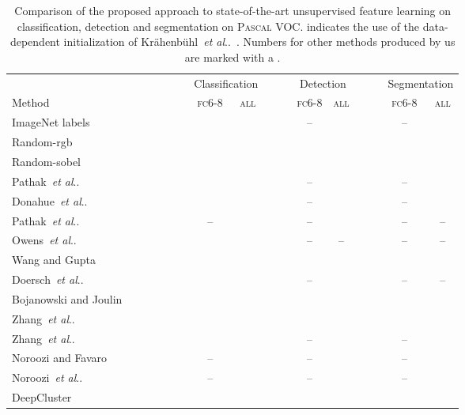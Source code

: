 \documentclass[runningheads]{llncs}
\makeatletter
\newlength{\soustable}
\DeclareRobustCommand\onedot{\futurelet\@let@token\@onedot}
\def\@onedot{\ifx\@let@token.\else.\null\fi\xspace}
\def\etal{\emph{et al}\onedot}
\def\OURS{DeepCluster\xspace}
\makeatother
\begin{document}
\begin{table}[t]
  \centering
  \begin{tabular}{lc cc c cc c cc}
    \toprule
    &~~~~~~~~& \multicolumn{2}{c}{Classification} &~~~& \multicolumn{2}{c}{Detection} &~~~& \multicolumn{2}{c}{Segmentation} \\
                      \cmidrule{3-4} \cmidrule{6-7} \cmidrule{9-10}
    Method && \textsc{fc6-8}& \textsc{all} && \textsc{fc6-8}& \textsc{all} && \textsc{fc6-8} & \textsc{all} \\
    \midrule
    ImageNet labels                                             &&  &  && --       &  && --       &  \\
    Random-rgb                                                  &&  &  &&  &  &&  &  \\
    Random-sobel                                                &&  &  &&  &  &&  &  \\
    \midrule
    Pathak~\etal~\cite{pathak2016context}                       &&  &  && --   &  && --   &  \\
    Donahue~\etal~\cite{donahue2016adversarial}             &&  &  && --   &  && --   &  \\
    Pathak~\etal~\cite{pathak2016learning}                      && --       &  && --   &  && --   & --     \\
		Owens~\etal~\cite{owens2016ambient}                     &&  &  && --   & --   && --   & --   \\
    Wang and Gupta~\cite{wang2015unsupervised}              &&  &  &&    &  &&    &    \\
    Doersch~\etal~\cite{doersch2015unsupervised}            &&  &  && --   &  && --   & --   \\
    Bojanowski and Joulin~\cite{bojanowski2017unsupervised} &&  &  &&  &  &&  &  \\ Zhang~\etal~\cite{zhang2016colorful}                    &&  &  &&  &  &&  &  \\ Zhang~\etal~\cite{zhang2016split}                       &&  &  && --   &  && --   &  \\
    Noroozi and Favaro~\cite{noroozi2016unsupervised}           && --       &  && --   &  && --   &   \\
    Noroozi~\etal~\cite{noroozi2017representation}              && --       &  && --   &  && --   &  \\
		\midrule
    \OURS &&  &  &&  &  &&  &  \\
    \bottomrule
  \end{tabular}
  \vspace{\soustable}
  \caption{
    Comparison of the proposed approach to state-of-the-art unsupervised feature learning on classification, detection and segmentation on \textsc{Pascal} VOC.
     indicates the use of the data-dependent initialization of Kr\"ahenb\"uhl~\etal~\cite{krahenbuhl2015data}.
    Numbers for other methods produced by us are marked with a .
  }
  \label{tab:voc}
\end{table}
\end{document}
